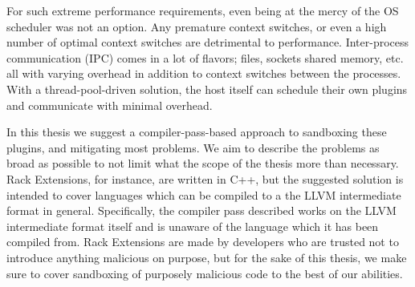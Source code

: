 For such extreme performance requirements, even being at the mercy of the OS
scheduler was not an option. Any premature context switches, or even a high 
number of optimal context switches are detrimental to performance. Inter-process
communication (IPC) comes in a lot of flavors; files, sockets shared memory,
etc. all with varying overhead in addition to context switches between the
processes. With a thread-pool-driven solution, the host itself can schedule
their own plugins and communicate with minimal overhead.

In this thesis we suggest a compiler-pass-based approach to sandboxing these
plugins, and mitigating most problems. We aim to describe the problems as broad
as possible to not limit what the scope of the thesis more than necessary. Rack
Extensions, for instance, are written in C++, but the suggested solution is
intended to cover languages which can be compiled to a the LLVM intermediate
format in general. Specifically, the compiler pass described works on the LLVM
intermediate format itself and is unaware of the language which it has been 
compiled from. Rack Extensions are made by developers who are trusted not to
introduce anything malicious on purpose, but for the sake of this thesis, we
make sure to cover sandboxing of purposely malicious code to the best of our
abilities.
